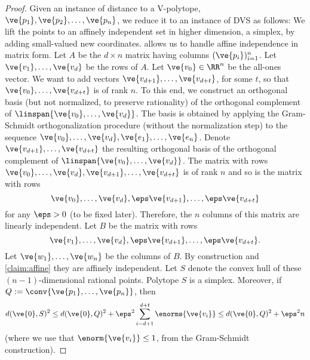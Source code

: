 \begin{proof}
Given an instance of distance to a V-polytope, $\ve{p_1}, \ve{p_2}, \dotsc, \ve{p_{n}}$, we reduce it to an instance of DVS as follows:
We lift the points to an affinely independent set in higher dimension, a simplex, by adding small-valued new coordinates.
 allows us to handle affine independence in matrix form.
Let $A$ be the $d \times n$ matrix having columns $(\ve{p_i})_{i=1}^n$. Let $\ve{v_1}, \dotsc, \ve{v_d}$ be the rows of $A$. 
Let $\ve{v_0} \in \RR^n$ be the all-ones vector.
We want to add vectors $\ve{v_{d+1}}, \dotsc, \ve{v_{d+t}}$, for some $t$, so that $\ve{v_0}, \dotsc, \ve{v_{d+t}}$ is of rank $n$.
To this end, we construct an orthogonal basis (but not normalized, to preserve rationality) of the orthogonal complement of $\linspan{\ve{v_0}, \dotsc, \ve{v_d}}$. 
The basis is obtained by applying the Gram-Schmidt orthogonalization procedure (without the normalization step) to the sequence $\ve{v_0}, \dotsc, \ve{v_d}, \ve{e_1}, \dotsc, \ve{e_n}$. 
Denote $\ve{v_{d+1}}, \dotsc, \ve{v_{d+t}}$ the resulting orthogonal basis of the orthogonal complement of $\linspan{\ve{v_0}, \dotsc, \ve{v_d}}$. 
The matrix with rows $\ve{v_0}, \dotsc, \ve{v_d}, \ve{v_{d+1}}, \dotsc, \ve{v_{d+t}}$ is of rank $n$ and so is the matrix with rows
\[
\ve{v_0}, \dotsc, \ve{v_d}, \eps \ve{v_{d+1}}, \dotsc, \eps \ve{v_{d+t}}
\]
for any $\eps > 0$ (to be fixed later). Therefore, the $n$ columns of this matrix are linearly independent.
Let $B$ be the matrix with rows
\[
\ve{v_1}, \dotsc, \ve{v_d}, \eps \ve{v_{d+1}}, \dotsc, \eps \ve{v_{d+t}}.
\]
Let $\ve{w_1}, \dotsc, \ve{w_n}$ be the columns of $B$. 
By construction and \cref{claim:affine} they are affinely independent.
Let $S$ denote the convex hull of these $(n-1)$-dimensional rational points.
Polytope $S$ is a simplex.
Moreover, if $Q := \conv \{ \ve{p_1}, \dotsc, \ve{p_{n}}\}$, then
\[
d(\ve{0},S)^2 
\leq d(\ve{0},Q)^2 + \eps^2 \sum_{i=d+1}^{d+t} \enorms{\ve{v_{i}}} 
\leq d(\ve{0},Q)^2 + \eps^2 n
\]
(where we use that $\enorm{\ve{v_{i}}} \leq 1$, from the Gram-Schmidt construction).


\end{proof}
